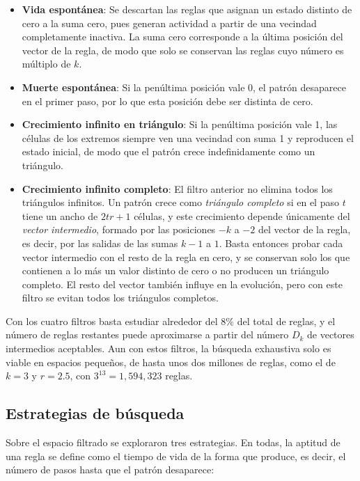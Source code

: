\begin{itemize}
	\item \textbf{Vida espontánea}: Se descartan las reglas que asignan un estado distinto de cero a la suma cero, pues generan actividad a partir de una vecindad completamente inactiva. La suma cero corresponde a la última posición del vector de la regla, de modo que solo se conservan las reglas cuyo número es múltiplo de $k$.
	
	\item \textbf{Muerte espontánea}: Si la penúltima posición vale 0, el patrón desaparece en el primer paso, por lo que esta posición debe ser distinta de cero.
	
	\item \textbf{Crecimiento infinito en triángulo}: Si la penúltima posición vale 1, las células de los extremos siempre ven una vecindad con suma 1 y reproducen el estado inicial, de modo que el patrón crece indefinidamente como un triángulo.
	
	\item \textbf{Crecimiento infinito completo}: El filtro anterior no elimina todos los triángulos infinitos. Un patrón crece como \textit{triángulo completo} si en el paso $t$ tiene un ancho de $2tr + 1$ células, y este crecimiento depende únicamente del \textit{vector intermedio}, formado por las posiciones $-k$ a $-2$ del vector de la regla, es decir, por las salidas de las sumas $k-1$ a $1$. Basta entonces probar cada vector intermedio con el resto de la regla en cero, y se conservan solo los que contienen a lo más un valor distinto de cero o no producen un triángulo completo. El resto del vector también influye en la evolución, pero con este filtro se evitan todos los triángulos completos.
\end{itemize}

Con los cuatro filtros basta estudiar alrededor del $8\%$ del total de reglas, y el número de reglas restantes puede aproximarse a partir del número $D_k$ de vectores intermedios aceptables. Aun con estos filtros, la búsqueda exhaustiva solo es viable en espacios pequeños, de hasta unos dos millones de reglas, como el de $k = 3$ y $r = 2.5$, con $3^{13} = 1{,}594{,}323$ reglas. 

\subsection{Estrategias de búsqueda}

Sobre el espacio filtrado se exploraron tres estrategias. En todas, la aptitud de una regla se define como el tiempo de vida de la forma que produce, es decir, el número de pasos hasta que el patrón desaparece:

